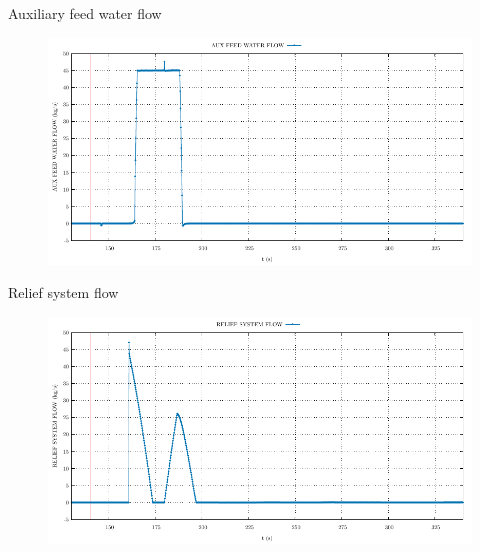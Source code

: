 \begin{frame}{Auxiliary feed water flow}
	\begin{figure}
		\centering
		\includegraphics[width=\textwidth]{./graphs/AUX FEED WATER FLOW_comp.pdf}
		
	\end{figure}
	
\end{frame}
\begin{frame}{Relief system flow}
	\begin{figure}
		\centering
		\includegraphics[width=\textwidth]{./graphs/RELIEF SYSTEM FLOW_comp.pdf}
		
	\end{figure}
	
\end{frame}

